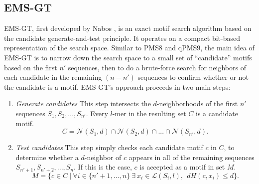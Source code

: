 \documentclass[oneside,12pt]{DISCSthesis}
\begin{document}
	\newpage
	\subsection{EMS-GT}
		EMS-GT, first developed by Nabos \cite{nabos2015dissertation}, is an exact motif search algorithm based on the candidate generate-and-test principle.
		It operates on a compact bit-based representation of the search space.
		Similar to PMS8 and qPMS9, the main idea of EMS-GT is to narrow down the search space to a small set of ``candidate'' motifs based on the first $n'$ sequences, then to do a brute-force search for neighbors of each candidate in the remaining $(n - n')$ sequences to confirm whether or not the candidate is a motif.
		EMS-GT's approach proceeds in two main steps:
		\begin{enumerate} %
			\item {\em Generate candidates}\newline
			This step intersects the $d$-neighborhoods of the first $n'$ sequences $S_{1},S_{2},...,S_{n'}$. Every $l$-mer in the resulting set $C$ is a candidate motif.
				\begin{equation} C = \mathcal{N}(S_{1}, d) \cap \mathcal{N}(S_{2}, d) \cap...\cap \mathcal{N}(S_{n'}, d). \end{equation}
			\item {\em Test candidates}\newline
			This step simply checks each candidate motif $c$ in $C$, to determine whether a $d$-neighbor of $c$ appears in all of the remaining sequences $S_{n'+1},S_{n'+2},...,S_{n}$. If this is the case, $c$ is accepted as a motif in set $M$.
				\begin{equation} M =\{ c \in C\ |\ \forall i \in \{n'+1,...,n\}\ \exists\ x_i \in \mathcal{L}(S_i, l),\ \ dH(c, x_i) \leq d \}. \end{equation}
			\end{enumerate}
\end{document}
